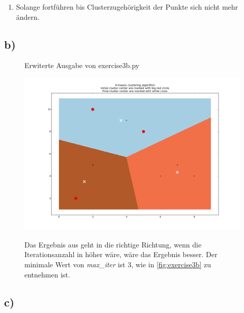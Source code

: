 \documentclass[a4paper,parskip=full-]{article}
\begin{document}
\begin{enumerate}

\item Solange fortführen bis Clusterzugehörigkeit der Punkte sich nicht mehr ändern.

\end{enumerate}

\subsection{b)}

\begin{figure}[H]
\caption{Erwiterte Ausgabe von exercise3b.py}
\label{fig:exercise3b}
\end{figure}

\begin{figure}[H]
\centering
\includegraphics[scale=0.5]{3b.png}

Das Ergebnis aus  geht in die richtige Richtung, 
wenn die Iterationsanzahl in  höher wäre, wäre das Ergebnis besser.
Der minimale Wert von \textit{max\_iter} ist $3$, wie in \autoref{fig:exercise3b} zu entnehmen ist.

\end{figure}

\subsection{c)}
\end{document}
